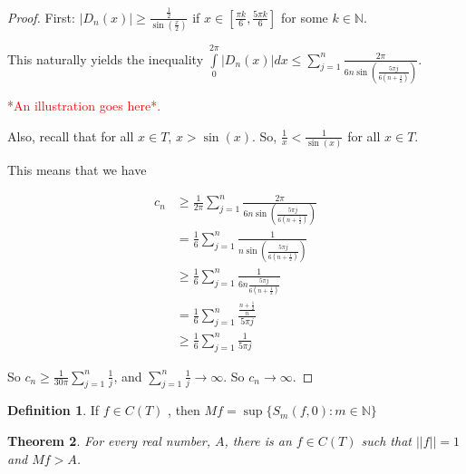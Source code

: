 \documentclass{amsart}
\newcommand{\N}{\mathbb{N}}
\newtheorem{thm}{Theorem}[section]
\theoremstyle{definition}
\newtheorem{definition}[thm]{Definition}
\begin{document}
\begin{proof}

First: $|D_n(x)| \geq \frac{\frac{1}{2}}{\sin(\frac{x}{2})}$ if $x \in [\frac{\pi k}{6},\frac{5 \pi k}{6}]$ for some $k \in \N$.

This naturally yields the inequality $\int\limits_0^{2\pi} |D_n(x)| dx \leq \sum\limits_{j=1}^n \frac{2 \pi}{6n \sin(\frac{5\pi j}{6(n+\frac{1}{2})})}$. 

\textcolor{red}{*An illustration goes here*.}

Also, recall that for all $x \in T$, $x > \sin(x)$. 
So, $\frac{1}{x} < \frac{1}{\sin(x)}$ for all $x \in T$.

This means that we have

\begin{align*}
c_n &\geq \frac{1}{2 \pi} \sum\limits_{j=1}^n \frac{2 \pi}{6n \sin(\frac{5\pi j}{6(n+\frac{1}{2})})}\\
&= \frac{1}{6} \sum\limits_{j=1}^n \frac{1}{n \sin(\frac{5\pi j}{6(n+\frac{1}{2})})}\\
&\geq \frac{1}{6} \sum\limits_{j=1}^n \frac{1}{6n \frac{5\pi j}{6(n+\frac{1}{2})}}\\
&= \frac{1}{6} \sum\limits_{j=1}^n \frac{\frac{n+\frac{1}{2}}{n}}{5\pi j}\\
&\geq \frac{1}{6} \sum\limits_{j=1}^n \frac{1}{5\pi j}
\end{align*}

So $c_n \geq \frac{1}{30 \pi} \sum\limits_{j=1}^n \frac{1}{ j}$, and $\sum\limits_{j=1}^n \frac{1}{j} \to \infty$. So $c_n \to \infty$.

\end{proof}

\begin{definition}
If $f \in C(T)$ , then $Mf = \sup\{S_m(f,0) : m \in \N\}$ 
\end{definition}

\begin{thm}
For every real number, $A$, there is an $f \in C(T)$ such that $||f|| = 1$ and $Mf > A$. 
\end{thm}
\end{document}
